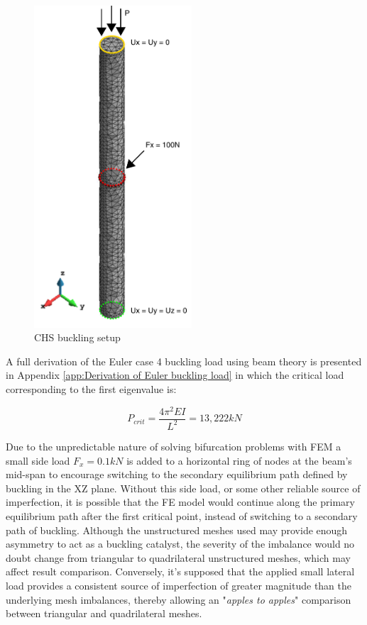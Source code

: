 \begin{figure}[H]
	\centering
	\includegraphics[height=12cm]{images/chs_buckling_setup}
	\caption{CHS buckling setup}
	\label{fig:chsbucklingsetup}
\end{figure}

A full derivation of the Euler case 4 buckling load using beam theory is presented in Appendix \ref{app:Derivation of Euler buckling load} in which the critical load corresponding to the first eigenvalue is:

\begin{equation} 
P_{crit} = \frac{4\pi^2 EI}{L^2} = 13, 222 kN
\label{eqchs_1}
\end{equation}

Due to the unpredictable nature of solving bifurcation problems with FEM a small side load $F_x = 0.1 kN$ is added to a horizontal ring of nodes at the beam's mid-span to encourage switching to the secondary equilibrium path defined by buckling in the XZ plane. Without this side load, or some other reliable source of imperfection, it is possible that the FE model would continue along the primary equilibrium path after the first critical point, instead of switching to a secondary path of buckling. Although the unstructured meshes used may provide enough asymmetry to act as a buckling catalyst, the severity of the imbalance would no doubt change from triangular to quadrilateral unstructured meshes, which may affect result comparison. Conversely, it's supposed that the applied small lateral load provides a consistent source of imperfection  of greater magnitude than the underlying mesh imbalances, thereby allowing an "\textit{apples to apples}" comparison between triangular and quadrilateral meshes.

